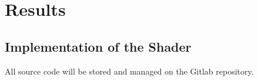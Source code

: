 \section{Results}

\subsection{Implementation of the Shader}
All source code will be stored and managed on the Gitlab repository\cite{gitlab-repo}.